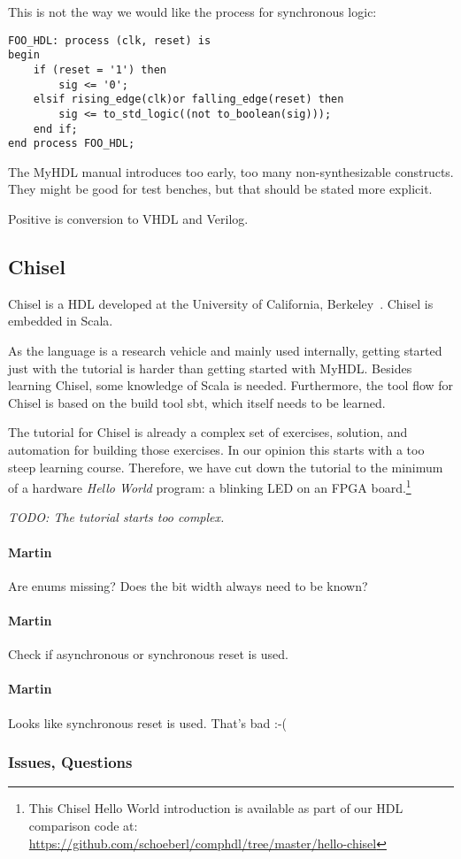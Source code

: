 \documentclass[10pt, conference, compsocconf]{IEEEtran}
\newcommand{\todo}[1]{{\emph{TODO: #1}}}
\newcommand{\comment}[3]{\paragraph*{\textbf{#1}}{\color{#3}#2}}
\newcommand{\martin}[1]{\comment{Martin}{#1}{Blue}}
\begin{document}
This is not the way we would like the process for synchronous logic:

\begin{verbatim}
FOO_HDL: process (clk, reset) is
begin
    if (reset = '1') then
        sig <= '0';
    elsif rising_edge(clk)or falling_edge(reset) then
        sig <= to_std_logic((not to_boolean(sig)));
    end if;
end process FOO_HDL;
\end{verbatim}

The MyHDL manual introduces too early, too many non-synthesizable constructs.
They might be good for test benches, but that should be stated more explicit.

Positive is conversion to VHDL and Verilog.

\subsection{Chisel}

Chisel is a HDL developed at the University of California, Berkeley~\cite{chisel:dac2012}.
Chisel is embedded in Scala.

As the language is a research vehicle and mainly used internally, getting
started just with the tutorial is harder than getting started with MyHDL.
Besides learning Chisel, some knowledge of Scala is needed. Furthermore,
the tool flow for Chisel is based on the build tool sbt, which itself needs to
be learned.

The tutorial for Chisel is already a complex set of exercises, solution, and
automation for building those exercises. In our opinion this starts with a
too steep learning course. Therefore, we have cut down the tutorial to
the minimum of a hardware \emph{Hello World} program: a blinking LED
on an FPGA board.\footnote{This Chisel Hello World introduction is
available as part of our HDL comparison code at:
\url{https://github.com/schoeberl/comphdl/tree/master/hello-chisel}}

\todo{The tutorial starts too complex.}

\martin{Are enums missing? Does the bit width always need to be known?}

\martin{Check if asynchronous or synchronous reset is used.}

\martin{Looks like synchronous reset is used. That's bad :-(}

\subsubsection{Issues, Questions}
\end{document}
